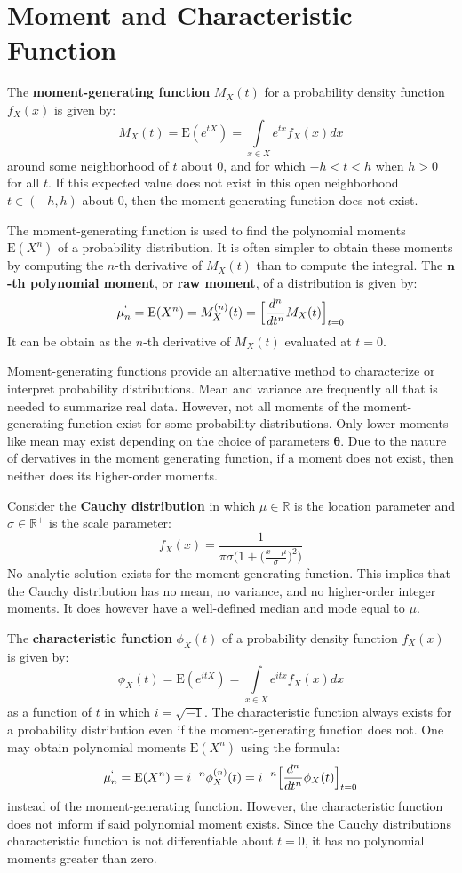 \documentclass[10pt, a5paper, twoside, openright]{memoir}
\begin{document}
\section{Moment and Characteristic Function}
The \textbf{moment-generating function} $M_X(t)$ for a probability density function $f_X(x)$ is given by:
$$M_X(t) = \mathrm{E}(e^{tX}) = \int\limits_{x \in X} e^{tx} f_X(x) dx$$
around some neighborhood of $t$ about $0$, and for which $-h < t < h$ when $h > 0$ for all $t$. If this expected value does not exist in this open neighborhood $t \in (-h,h)$ about $0$, then the moment generating function does not exist. 

The moment-generating function is used to find the polynomial moments $\mathrm{E}(X^n)$ of a probability distribution. It is often simpler to obtain these moments by computing the $n$-th derivative of $M_X(t)$ than to compute the integral. The \textbf{$\boldsymbol n$-th polynomial moment}, or \textbf{raw moment}, of a distribution is given by:
$$\mu^`_n = \mathrm{E}(X^n) = M_X^{(n)}(t) = \Big[ \frac{d^n}{dt^n} M_X(t) \Big ]_{t=0}$$
It can be obtain as the $n$-th derivative of $M_X(t)$ evaluated at $t=0$.

Moment-generating functions provide an alternative method to characterize or interpret probability distributions. Mean and variance are frequently all that is needed to summarize real data. However, not all moments of the moment-generating function exist for some probability distributions. Only lower moments like mean may exist depending on the choice of parameters $\boldsymbol \theta$. Due to the nature of dervatives in the moment generating function, if a moment does not exist, then neither does its higher-order moments.

Consider the \textbf{Cauchy distribution} in which $\mu \in \mathbb R$ is the location parameter and $\sigma \in \mathbb R^+$ is the scale parameter:
$$f_X(x) = \frac{1}{\pi \sigma \Big (1 + (\frac{x - \mu}{\sigma} \big)^2 \Big)}$$
No analytic solution exists for the moment-generating function. This implies that the Cauchy distribution has no mean, no variance, and no higher-order integer moments. It does however have a well-defined median and mode equal to $\mu$.

The \textbf{characteristic function} $\phi_X(t)$ of a probability density function $f_X(x)$ is given by:
$$\phi_X(t) = \mathrm{E}(e^{itX}) = \int\limits_{x \in X} e^{itx} f_X(x) dx$$
as a function of $t$ in which $i = \sqrt{-1}$. The characteristic function always exists for a probability distribution even if the moment-generating function does not. One may obtain polynomial moments $\mathrm{E}(X^n)$ using the formula:
$$\mu^`_n = \mathrm{E}(X^n) = i^{-n} \phi_X^{(n)}(t) = i^{-n} \Big[ \frac{d^n}{dt^n} \phi_X(t) \Big ]_{t=0}$$
instead of the moment-generating function. However, the characteristic function does not inform if said polynomial moment exists. Since the Cauchy distributions characteristic function is not differentiable about $t=0$, it has no polynomial moments greater than zero.
\end{document}

